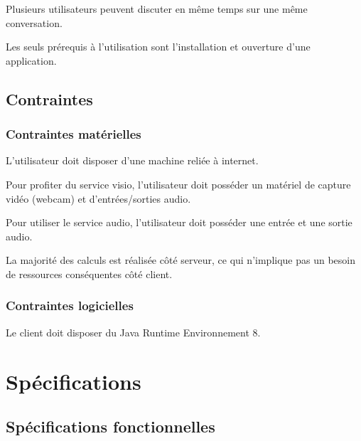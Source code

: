 \documentclass[11pt,dvipsnames,svgnames]{report}
\begin{document}
\begin{mdframed}[topline=false,rightline=false,bottomline=false, linewidth=3pt,linecolor=red]
Plusieurs utilisateurs peuvent discuter en même temps sur une même conversation.
\end{mdframed}

Les seuls prérequis à l'utilisation sont l'installation et ouverture d'une application.
\section{Contraintes}
\subsection{Contraintes matérielles}
L'utilisateur doit disposer d'une machine reliée à internet.

Pour profiter du service visio, l'utilisateur doit posséder un matériel de capture vidéo (webcam) et d'entrées/sorties audio.

Pour utiliser le service audio, l'utilisateur doit posséder une entrée et une sortie audio.

La majorité des calculs est réalisée côté serveur, ce qui n'implique pas un besoin de ressources conséquentes côté client.

\subsection{Contraintes logicielles}

Le client doit disposer du Java Runtime Environnement 8.

\chapter{Spécifications}

\section{Spécifications fonctionnelles}
\end{document}
